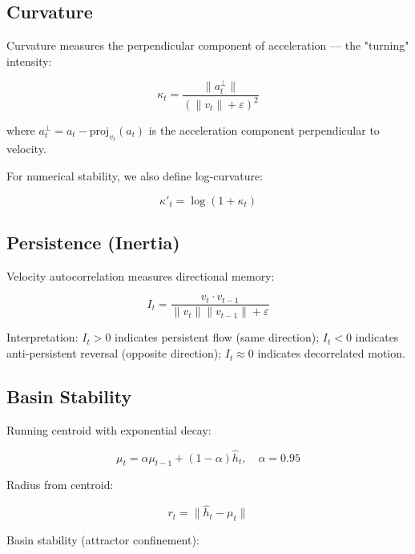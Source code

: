 \documentclass[12pt,a4paper]{article}
\begin{document}
\subsection{Curvature}

Curvature measures the perpendicular component of acceleration — the "turning" intensity:

\begin{equation}
\kappa_t = \frac{\|a_t^{\perp}\|}{(\|v_t\| + \varepsilon)^2}
\end{equation}

where $a_t^{\perp} = a_t - \text{proj}_{v_t}(a_t)$ is the acceleration component perpendicular to velocity.

For numerical stability, we also define log-curvature:

\begin{equation}
\kappa'_t = \log(1 + \kappa_t)
\end{equation}

\subsection{Persistence (Inertia)}

Velocity autocorrelation measures directional memory:

\begin{equation}
I_t = \frac{v_t \cdot v_{t-1}}{\|v_t\| \|v_{t-1}\| + \varepsilon}
\end{equation}

Interpretation: $I_t > 0$ indicates persistent flow (same direction); $I_t < 0$ indicates anti-persistent reversal (opposite direction); $I_t \approx 0$ indicates decorrelated motion.

\subsection{Basin Stability}

Running centroid with exponential decay:

\begin{equation}
\mu_t = \alpha \mu_{t-1} + (1 - \alpha) \hat{h}_t, \quad \alpha = 0.95
\end{equation}

Radius from centroid:

\begin{equation}
r_t = \|\hat{h}_t - \mu_t\|
\end{equation}

Basin stability (attractor confinement):
\end{document}
